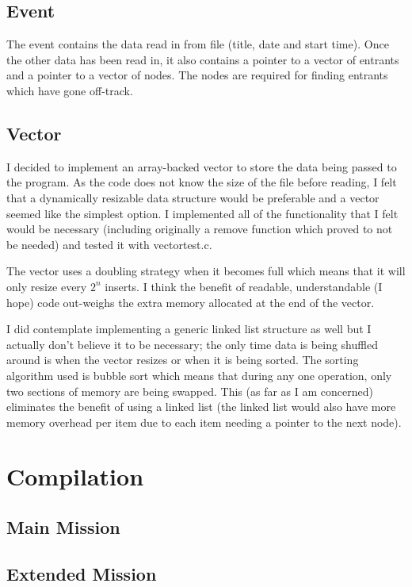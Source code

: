 \documentclass[a4paper, twoside]{article}
\begin{document}
\subsection{Event}
The event contains the data read in from file (title, date and start time).
Once the other data has been read in, it also contains a pointer to a vector
of entrants and a pointer to a vector of nodes. The nodes are required for
finding entrants which have gone off-track.

\subsection{Vector}
I decided to implement an array-backed vector to store the data being passed to
the program. As the code does not know the size of the file before reading, I
felt that a dynamically resizable data structure would be preferable and a
vector seemed like the simplest option. I implemented all of the functionality
that I felt would be necessary (including originally a remove function which
proved to not be needed) and tested it with vectortest.c.

The vector uses a doubling strategy when it becomes full which means that it
will only resize every $2^n$ inserts. I think the benefit of readable,
understandable (I hope) code out-weighs the extra memory allocated at the
end of the vector.

I did contemplate implementing a generic linked list structure as well but I
actually don't believe it to be necessary; the only time data is being shuffled
around is when the vector resizes or when it is being sorted. The sorting
algorithm used is bubble sort which means that during any one operation, only
two sections of memory are being swapped. This (as far as I am concerned)
eliminates the benefit of using a linked list (the linked list would also have
more memory overhead per item due to each item needing a pointer to the next
node).

\newpage
\section{Compilation}
\subsection{Main Mission}


\subsection{Extended Mission}

\end{document}
